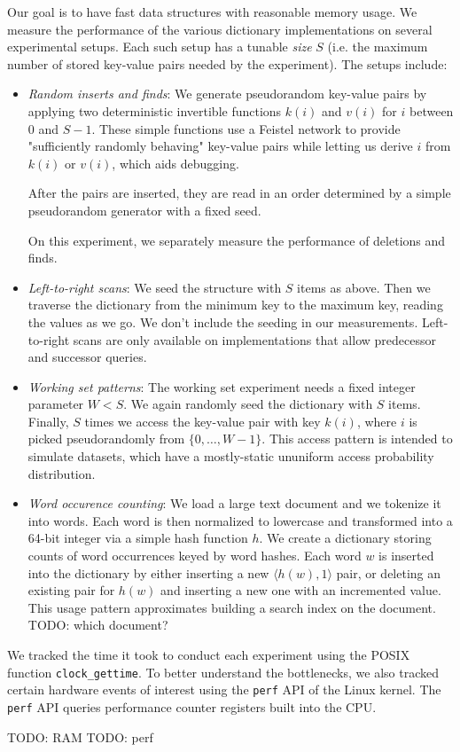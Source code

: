 Our goal is to have fast data structures with reasonable memory usage.
We measure the performance of the various dictionary implementations
on several experimental setups. Each such setup has a tunable \textit{size} $S$
(i.e. the maximum number of stored key-value pairs needed by the experiment).
The setups include:
\begin{itemize}
\item
	\textit{Random inserts and finds}: We generate pseudorandom key-value
	pairs by applying two deterministic invertible functions $k(i)$
	and $v(i)$ for $i$ between 0 and $S-1$.
	These simple functions use a Feistel network to provide
	"sufficiently randomly behaving" key-value pairs while letting us
	derive $i$ from $k(i)$ or $v(i)$, which aids debugging.

	After the pairs are inserted, they are read in an order determined
	by a simple pseudorandom generator with a fixed seed.

	On this experiment, we separately measure the performance of deletions
	and finds.

\item
	\textit{Left-to-right scans}: We seed the structure with $S$ items
	as above. Then we traverse the dictionary from the minimum key to
	the maximum key, reading the values as we go. We don't include
	the seeding in our measurements.
	Left-to-right scans are only available on implementations that
	allow predecessor and successor queries.

\item
	\textit{Working set patterns}: The working set experiment needs
	a fixed integer parameter $W<S$. We again randomly seed the dictionary
	with $S$ items. Finally, $S$ times we access the key-value pair
	with key $k(i)$, where $i$ is picked pseudorandomly from
	$\{0,\ldots,W-1\}$.
	This access pattern is intended to simulate datasets, which have
	a mostly-static ununiform access probability distribution.

\item
	\textit{Word occurence counting}: We load a large text document
	and we tokenize it into words. Each word is then normalized
	to lowercase and transformed into a 64-bit integer via a simple
	hash function $h$. We create a dictionary storing counts of word
	occurrences keyed by word hashes. Each word $w$ is inserted into
	the dictionary by either inserting a new $\langle h(w), 1\rangle$ pair,
	or deleting an existing pair for $h(w)$ and inserting a new one
	with an incremented value.
	This usage pattern approximates building a search index on the document.
	TODO: which document?
\end{itemize}

We tracked the time it took to conduct each experiment using the POSIX function
\texttt{clock\_gettime}. To better understand the bottlenecks, we also
tracked certain hardware events of interest using the \texttt{perf} API of
the Linux kernel. The \texttt{perf} API queries performance counter registers
built into the CPU.

TODO: RAM
TODO: perf
